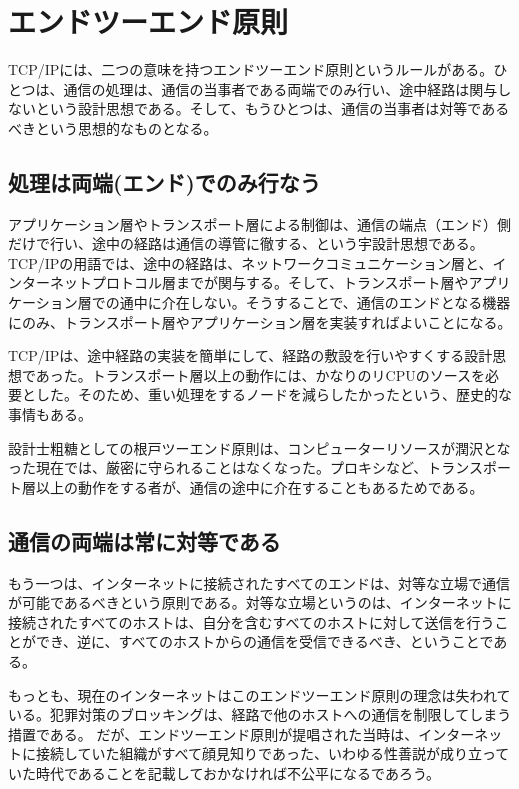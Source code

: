 \section{エンドツーエンド原則}
TCP/IPには、二つの意味を持つエンドツーエンド原則というルールがある。ひとつは、通信の処理は、通信の当事者である両端でのみ行い、途中経路は関与しないという設計思想である。そして、もうひとつは、通信の当事者は対等であるべきという思想的なものとなる。

\subsection{処理は両端(エンド)でのみ行なう}

アプリケーション層やトランスポート層による制御は、通信の端点（エンド）側だけで行い、途中の経路は通信の導管に徹する、という宇設計思想である。
TCP/IPの用語では、途中の経路は、ネットワークコミュニケーション層と、インターネットプロトコル層までが関与する。そして、トランスポート層やアプリケーション層での通中に介在しない。そうすることで、通信のエンドとなる機器にのみ、トランスポート層やアプリケーション層を実装すればよいことになる。

TCP/IPは、途中経路の実装を簡単にして、経路の敷設を行いやすくする設計思想であった。トランスポート層以上の動作には、かなりのリCPUのソースを必要とした。そのため、重い処理をするノードを減らしたかったという、歴史的な事情もある。

設計士粗糖としての根戸ツーエンド原則は、コンピューターリソースが潤沢となった現在では、厳密に守られることはなくなった。プロキシなど、トランスポート層以上の動作をする者が、通信の途中に介在することもあるためである。

\subsection{通信の両端は常に対等である}

もう一つは、インターネットに接続されたすべてのエンドは、対等な立場で通信が可能であるべきという原則である。対等な立場というのは、インターネットに接続されたすべてのホストは、自分を含むすべてのホストに対して送信を行うことができ、逆に、すべてのホストからの通信を受信できるべき、ということである。

もっとも、現在のインターネットはこのエンドツーエンド原則の理念は失われている。犯罪対策のブロッキングは、経路で他のホストへの通信を制限してしまう措置である。
だが、エンドツーエンド原則が提唱された当時は、インターネットに接続していた組織がすべて顔見知りであった、いわゆる性善説が成り立っていた時代であることを記載しておかなければ不公平になるであろう。

